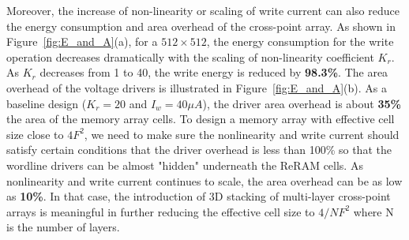 Moreover, the increase of non-linearity or scaling of write current can also reduce the energy consumption and area overhead of the cross-point array. As shown in Figure~\ref{fig:E_and_A}(a), for a $512 \times 512$, the energy consumption for the write operation decreases dramatically with the scaling of non-linearity coefficient $K_r$. As $K_r$ decreases from 1 to 40, the write energy is reduced by \textbf{98.3\%}. The area overhead of the voltage drivers is illustrated in Figure~\ref{fig:E_and_A}(b). As a baseline design ($K_r=20$ and $I_w=40\mu A$), the driver area overhead is about \textbf{35\%} the area of the memory array cells. To design a memory array with effective cell size close to $4F^2$, we need to make sure the nonlinearity and write current should satisfy certain conditions that the driver overhead is less than 100\% so that the wordline drivers can be almost "hidden" underneath the ReRAM cells. As nonlinearity and write current continues to scale, the area overhead can be as low as \textbf{10\%}. In that case, the introduction of 3D stacking of multi-layer cross-point arrays is meaningful in further reducing the effective cell size to $4/N F^2$ where N is the number of layers.



